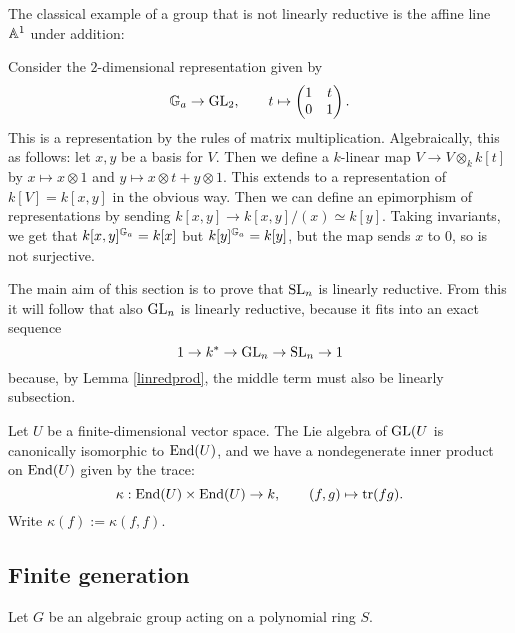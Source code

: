 \documentclass[11pt, english]{article}
\begin{document}
The classical example of a group that is not linearly reductive is the affine line $\mathbb{A}^1$ under addition:
\begin{example}
 Consider the $2$-dimensional representation given by
\[
\mathbb{G}_a \to \operatorname{GL}_2, \qquad t \mapsto \begin{pmatrix} 1 & t \\ 0 & 1 \end{pmatrix}.
\]
This is a representation by the rules of matrix multiplication. Algebraically, this as follows: let $x,y$ be a basis for $V$. Then we define a $k$-linear map $V \to V \otimes_k k[t]$ by $x \mapsto x \otimes 1$ and $y \mapsto x \otimes t + y \otimes 1$. This extends to a representation of $k[V]=k[x,y]$ in the obvious way. Then we can define an epimorphism of representations by sending $k[x,y] \to k[x,y]/(x) \simeq k[y]$. Taking invariants, we get that $k[x,y]^{\mathbb{G}_a} = k[x]$ but $k[y]^{\mathbb{G}_a}=k[y]$, but the map sends $x$ to $0$, so is not surjective.
\end{example}

The main aim of this section is to prove that $\operatorname{SL}_n$ is linearly reductive. From this it will follow that also $\operatorname{GL}_n$ is linearly reductive, because it fits into an exact sequence 
$$
1 \to k^\ast \to \operatorname{GL}_n \to \operatorname{SL}_n \to 1
$$
because, by Lemma \ref{linredprod}, the middle term must also be linearly subsection.

Let $U$ be a finite-dimensional vector space. The Lie algebra of $\operatorname{GL}(U$ is canonically isomorphic to $\operatorname{End}(U)$, and we have a nondegenerate inner product on $\operatorname{End}(U)$ given by the trace:
$$
\kappa:\operatorname{End}(U) \times \operatorname{End}(U) \to k, \qquad (f,g) \mapsto \operatorname{tr}(fg).
$$
Write $\kappa(f) := \kappa(f,f)$. 

\subsection{Finite generation}

Let $G$ be an algebraic group acting on a polynomial ring $S$.
\end{document}
